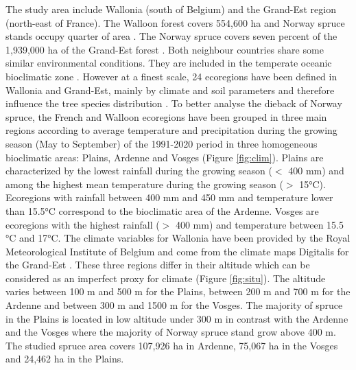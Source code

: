 \documentclass[3p,procedia]{elsarticle}
\begin{document}
The study area include Wallonia (south of Belgium) and the Grand-Est region (north-east of France).
The Walloon forest covers 554,600 ha and  Norway spruce stands occupy quarter of area \citep{lejeune_ep_2022}.  
The Norway spruce covers seven percent of the 1,939,000 ha of the Grand-Est forest \citep{IGN2022}. 
Both neighbour countries share some similar environmental conditions.
They are included in the temperate oceanic bioclimatic zone \citep{lindner_climate_2010}.
However at a finest scale, 24 ecoregions have been defined in  Wallonia and Grand-Est, mainly by climate and soil parameters and therefore influence the tree species distribution \citep{walthert_tree_2017}.
To better analyse the dieback of Norway spruce, the French and Walloon ecoregions have been grouped in three main regions according to average temperature and precipitation during the growing season (May to September) of the 1991-2020 period in three homogeneous bioclimatic areas: Plains, Ardenne and Vosges (Figure \ref{fig:clim}).
Plains are characterized by the lowest rainfall during the growing season ($<$ 400 mm) and among the highest mean temperature during the growing season ($>$ 15°C).
Ecoregions with rainfall between 400 mm and 450 mm and temperature lower than 15.5°C correspond to the bioclimatic area of the Ardenne.
Vosges are ecoregions with the highest rainfall ($>$ 400 mm) and temperature between 15.5 °C and 17°C.
The climate variables for Wallonia have been provided by the Royal Meteorological Institute of Belgium and come from the climate maps Digitalis for the Grand-Est \citep{piedallu_presentation_2014}.
These three regions differ in their altitude which can be considered as an imperfect proxy for climate (Figure \ref{fig:situ}). 
The altitude varies between 100 m and 500 m for the Plains, between 200 m and 700 m for the Ardenne and between 300 m and 1500 m for the Vosges.
The majority of spruce in the Plains is located in low altitude under 300 m in contrast with the Ardenne and the Vosges where the majority of Norway spruce stand grow above 400 m. 
The studied spruce area covers 107,926 ha in Ardenne, 75,067 ha in the Vosges and  24,462 ha in the Plains.
\end{document}
